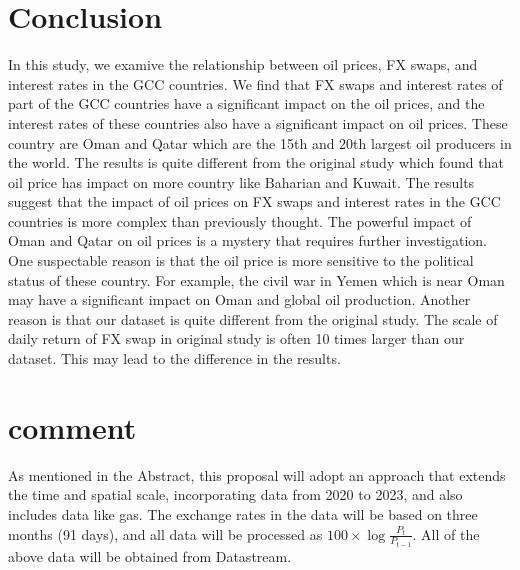 \documentclass[12pt]{article}
\begin{document}
\begin{sloppypar}
\section{Conclusion}
In this study, we examive the relationship between oil prices, FX swaps, and interest rates in the GCC countries. We find that FX swaps and interest rates of part of the GCC countries have a significant impact on the oil prices, and the interest rates of these countries also have a significant impact on oil prices. These country are Oman and Qatar which are the 15th and 20th largest oil producers in the world. The results is quite different from the original study which found that oil price has impact on more country like Baharian and Kuwait. The results suggest that the impact of oil prices on FX swaps and interest rates in the GCC countries is more complex than previously thought. The powerful impact of Oman and Qatar on oil prices is a mystery that requires further investigation. One suspectable reason is that the oil price is more sensitive to the political status of these country. For example, the civil war in Yemen which is near Oman may have a significant impact on Oman and global oil production. Another reason is that our dataset is quite different from the original study. The scale of daily return of FX swap in original study is often 10 times larger than our dataset. This may lead to the difference in the results.


\section{comment}
As mentioned in the Abstract, this proposal will adopt an approach that extends the time and spatial scale, incorporating data from 2020 to 2023, and also includes data like gas. The exchange rates in the data will be based on three months (91 days), and all data will be processed as $100 \times \log \frac{P_t}{P_{t-1}}$. All of the above data will be obtained from Datastream.

\printbibliography
\end{sloppypar}
\end{document}
